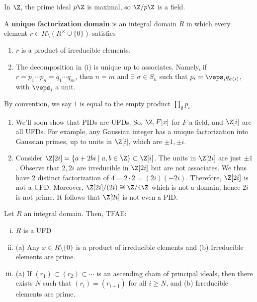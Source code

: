 \begin{ex}
    In $\Z$, the prime ideal $p\Z$ is maximal, so $\Z/p\Z$ is a field.
\end{ex}

\begin{defn}
    A \textbf{unique factorization domain} is an integral domain $R$ in which every element $r \in R\setminus(R^\times \cup \{ 0 \})$ satisfies
    \begin{enumerate}
        \item[(i)] $r$ is a product of irreducible elements.
        \item[(ii)] The decomposition in (i) is unique up to associates. Namely, if $r=p_1\cdots p_n=q_1\cdots q_m$, then $n=m$ and $\exists$ $\sigma \in S_n$ such that $p_i=\veps_iq_{\sigma (i)}$, with $\veps_i$ a unit.
    \end{enumerate}
    By convention, we say $1$ is equal to the empty product $\prod _{\emptyset}p_i$.
\end{defn}

\begin{ex}
    \begin{enumerate}
        \item We'll soon show that PIDs are UFDs. So, $\Z,F[x]$ for $F$ a field, and $\Z[i]$ are all UFDs. For example, any Gaussian integer has a unique factorization into Gaussian primes, up to units in $\Z[i]$, which are $\pm 1, \pm i$.
        \item Consider $\Z[2i]=\{a + 2bi \mid a,b \in \Z\} \subset \Z[i]$. The units in $\Z[2i]$ are just $\pm 1$. Observe that $2,2i$ are irreducible in $\Z[2i]$ but are not associates. We thus have 2 distinct factorization of $4=2\cdot 2 = (2i)(-2i)$. Therefore, $\Z[2i]$ is not a UFD. Moreover, $\Z[2i]/(2i) \cong \Z/4\Z$ which is not a domain, hence $2i$ is not prime. It follows that $\Z[2i]$ is not even a PID.
    \end{enumerate}
\end{ex}

\begin{prop}[][label=prop:ufd-criterion]
    Let $R$ an integral domain. Then, TFAE:
    \begin{enumerate}[(i)]
        \item $R$ is a UFD
        \item (a) Any $x \in R\setminus \{0\}$ is a product of irreducible elements and (b) Irreducible elements are prime.
        \item (a) If $(r_1)\subset (r_2) \subset \cdots$ is an ascending chain of principal ideals, then there exists $N$ such that $(r_i) = (r_{i+1})$ for all $i \geq N$, and (b) Irreducible elements are prime.
    \end{enumerate}
\end{prop}

